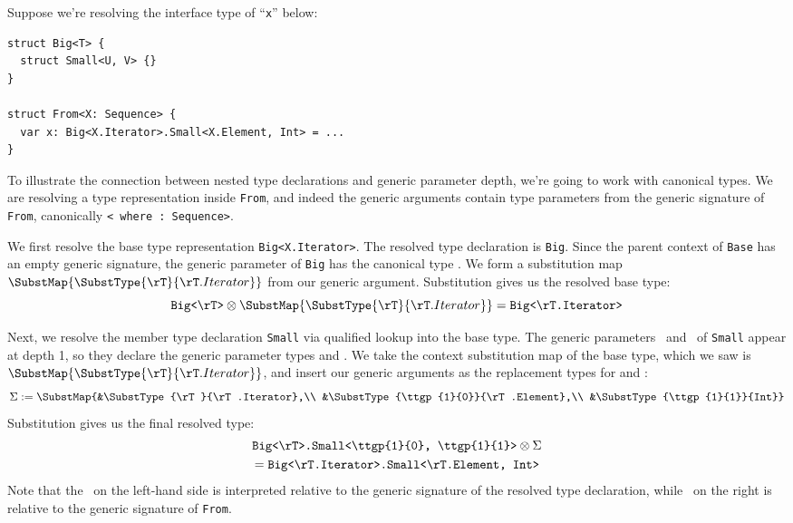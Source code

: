 \documentclass[../generics]{subfiles}
\begin{document}
\begin{example}
Suppose we're resolving the interface type of ``\texttt{x}'' below:
\begin{Verbatim}
struct Big<T> {
  struct Small<U, V> {}
}

struct From<X: Sequence> {
  var x: Big<X.Iterator>.Small<X.Element, Int> = ...
}
\end{Verbatim}
To illustrate the connection between nested type declarations and generic parameter depth, we're going to work with canonical types. We are resolving a type representation inside \texttt{From}, and indeed the generic arguments contain type parameters from the generic signature of \texttt{From}, canonically \texttt{<\rT\ where \rT:~Sequence>}.

We first resolve the base type representation \texttt{Big<X.Iterator>}. The resolved type declaration is \texttt{Big}. Since the parent context of \texttt{Base} has an empty generic signature, the generic parameter of \texttt{Big} has the canonical type \rT. We form a substitution map $\SubstMap{\SubstType{\rT}{\rT.Iterator}}$ from our generic argument. Substitution gives us the resolved base type:
\[\texttt{Big<\rT>}\otimes\SubstMap{\SubstType{\rT}{\rT.Iterator}}=\texttt{Big<\rT.Iterator>}\]

Next, we resolve the member type declaration \texttt{Small} via qualified lookup into the base type. The generic parameters \tU\ and \tV\ of \texttt{Small} appear at depth 1, so they declare the generic parameter types  and . We take the context substitution map of the base type, which we saw is $\SubstMap{\SubstType{\rT}{\rT.Iterator}}$, and insert our generic arguments as the replacement types for  and :
\begin{align*}
\Sigma := \SubstMap{&\SubstType{\rT}{\rT.Iterator},\\
&\SubstType{\ttgp{1}{0}}{\rT.Element},\\
&\SubstType{\ttgp{1}{1}}{Int}}
\end{align*}
Substitution gives us the final resolved type:
\begin{multline*}
\texttt{Big<\rT>.Small<\ttgp{1}{0}, \ttgp{1}{1}>}\otimes\Sigma\\
= \texttt{Big<\rT.Iterator>.Small<\rT.Element, Int>}
\end{multline*}
Note that the \rT\ on the left-hand side is interpreted relative to the generic signature of the resolved type declaration, while \rT\ on the right is relative to the generic signature of \texttt{From}.
\end{example}
\end{document}
